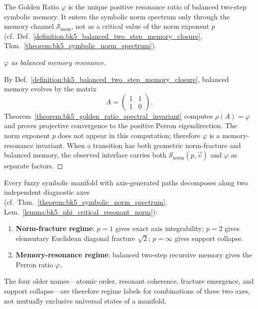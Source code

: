 \begin{lemma}
\label{lemma:bk5_phi_critical_resonant_norm}
The Golden Ratio $\varphi$ is the unique positive resonance ratio of balanced
two-step symbolic memory.  It enters the symbolic norm spectrum only through
the memory channel $\mathcal{S}_{\mathrm{mem}}$, not as a critical value of the
norm exponent $p$ (cf.~Def.~\ref{definition:bk5_balanced_two_step_memory_closure},
Thm.~\ref{theorem:bk5_symbolic_norm_spectrum}).
\end{lemma}

\begin{proof}[$\varphi$ as balanced memory resonance]
\label{proof:bk5_phi_critical_resonant_norm}
\leavevmode

By Def.~\ref{definition:bk5_balanced_two_step_memory_closure}, balanced memory
evolves by the matrix
\[
A=\begin{pmatrix}1&1\\1&0\end{pmatrix}.
\]
Theorem~\ref{theorem:bk5_golden_ratio_spectral_invariant} computes
$\rho(A)=\varphi$ and proves projective convergence to the positive Perron
eigendirection.  The norm exponent $p$ does not appear in this computation;
therefore $\varphi$ is a memory-resonance invariant.  When a transition has both
geometric norm-fracture and balanced memory, the observed interface carries both
$\mathcal{S}_{\mathrm{norm}}(p,\vec{v})$ and $\varphi$ as separate factors.
\end{proof}

\begin{proposition}
\label{proposition:bk5_complete_symbolic_regime_classification}
Every fuzzy symbolic manifold with axis-generated paths decomposes along two
independent diagnostic axes (cf.~Thm.~\ref{theorem:bk5_symbolic_norm_spectrum},
Lem.~\ref{lemma:bk5_phi_critical_resonant_norm}):

\begin{enumerate}
\item \textbf{Norm-fracture regime}: $p=1$ gives exact axis integrability;
$p=2$ gives elementary Euclidean diagonal fracture $\sqrt{2}$; $p=\infty$
gives support collapse.
\item \textbf{Memory-resonance regime}: balanced two-step recursive memory gives
the Perron ratio $\varphi$.
\end{enumerate}

The four older names---atomic order, resonant coherence, fracture emergence, and
support collapse---are therefore regime labels for combinations of these two
axes, not mutually exclusive universal states of a manifold.
\end{proposition}

